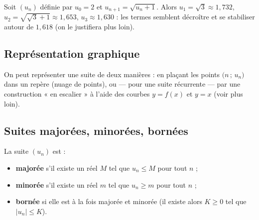 \begin{exemple}
Soit $(u_n)$ définie par $u_0=2$ et $u_{n+1}=\sqrt{u_n+1}$. Alors
$u_1=\sqrt{3}\approx1{,}732$, $u_2=\sqrt{\sqrt3+1}\approx1{,}653$, $u_3\approx1{,}630$ :
les termes semblent décroître et se stabiliser autour de $1{,}618$ (on le justifiera plus loin).
\end{exemple}

\subsection{Représentation graphique}

On peut représenter une suite de deux manières : en plaçant les points $\bigl(n\,;\,u_n\bigr)$
dans un repère (nuage de points), ou — pour une suite récurrente — par une construction
« en escalier » à l'aide des courbes $y=f(x)$ et $y=x$ (voir plus loin).

\begin{illus}
\end{illus}

\subsection{Suites majorées, minorées, bornées}

\begin{definition}
La suite $(u_n)$ est :
\begin{itemize}
\item \textbf{majorée} s'il existe un réel $M$ tel que $u_n\le M$ pour tout $n$ ;
\item \textbf{minorée} s'il existe un réel $m$ tel que $u_n\ge m$ pour tout $n$ ;
\item \textbf{bornée} si elle est à la fois majorée et minorée (il existe alors $K\ge0$ tel que $|u_n|\le K$).
\end{itemize}
\end{definition}


